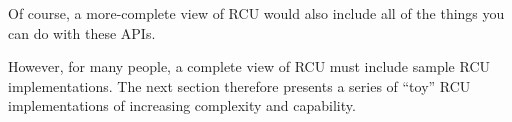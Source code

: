 Of course, a more-complete view of RCU would also include
all of the things you can do with these APIs.

However, for many people, a complete view of RCU must include sample
RCU implementations.
The next section therefore presents a series of ``toy'' RCU implementations
of increasing complexity and capability.
